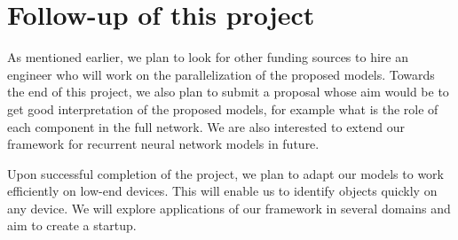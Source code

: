 \documentclass[11pt]{article}
\begin{document}
\section{Follow-up of this project}
As mentioned earlier, we plan to look for other funding sources to hire an engineer who will work on the parallelization of the proposed models. Towards the end of this project, we also plan to submit a proposal whose aim would be to get good interpretation of the proposed models, for example what is the role of each component in the full network. We are also interested to extend our framework for recurrent neural network models in future. 

Upon successful completion of the project, we plan to adapt our models to work efficiently on low-end devices. This will enable us to  identify objects quickly on any device. We will explore applications of our framework in several domains and aim to create a startup.

{\footnotesize


}
\end{document}
